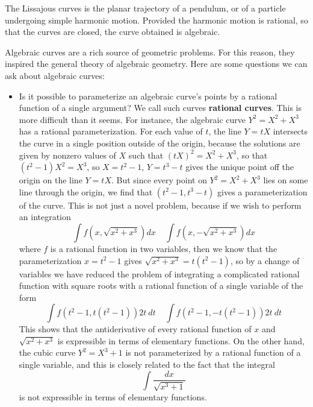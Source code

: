 \begin{example}
    The Lissajous curves is the planar trajectory of a pendulum, or of a particle undergoing simple harmonic motion. Provided the harmonic motion is rational, so that the curves are closed, the curve obtained is algebraic.
\end{example}

Algebraic curves are a rich source of geometric problems. For this reason, they inspired the general theory of algebraic geometry. Here are some questions we can ask about algebraic curves:
%
\begin{itemize}
    \item Is it possible to parameterize an algebraic curve's points by a rational function of a single argument? We call such curves {\bf rational curves}. This is more difficult than it seems. For instance, the algebraic curve $Y^2 = X^2 + X^3$ has a rational parameterization. For each value of $t$, the line $Y = tX$ intersects the curve in a single position outside of the origin, because the solutions are given by nonzero values of $X$ such that $(tX)^2 = X^2 + X^3$, so that $(t^2 - 1)X^2 = X^3$, so $X = t^2 - 1$, $Y = t^3 - t$ gives the unique point off the origin on the line $Y = tX$. But since every point on $Y^2 = X^2 + X^3$ lies on some line through the origin, we find that $(t^2 - 1, t^3 - t)$ gives a parameterization of the curve. This is not just a novel problem, because if we wish to perform an integration
    \[ \int f \left(x, \sqrt{x^2 + x^3} \right) dx\ \ \ \ \ \int f \left( x, - \sqrt{x^2 + x^3} \right) dx \]
    where $f$ is a rational function in two variables, then we know that the parameterization $x = t^2 - 1$ gives $\sqrt{x^2 + x^3} = t(t^2-1)$, so by a change of variables we have reduced the problem of integrating a complicated rational function with square roots with a rational function of a single variable of the form
    \[ \int f(t^2 - 1, t(t^2 - 1)) 2t\ dt\ \ \ \ \ \int f(t^2 - 1, -t(t^2 - 1)) 2t\ dt \]
    This shows that the antiderivative of every rational function of $x$ and $\sqrt{x^2 + x^3}$ is expressible in terms of elementary functions. On the other hand, the cubic curve $Y^2 = X^3 + 1$ is not parameterized by a rational function of a single variable, and this is closely related to the fact that the integral
    \[ \int \frac{dx}{\sqrt{x^3 + 1}} \]
    is not expressible in terms of elementary functions.


\end{itemize}
